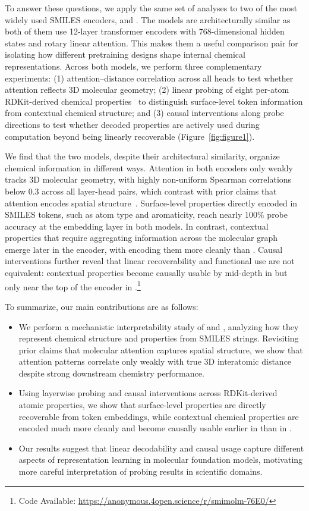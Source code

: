 To answer these questions, we apply the same set of analyses to two of the most widely used SMILES encoders, \molm and \smi. The models are architecturally similar as both of them use 12-layer transformer encoders with 768-dimensional hidden states and rotary linear attention. This makes them a useful comparison pair for isolating how different pretraining designs shape internal chemical representations. Across both models, we perform three complementary experiments: (1) attention–distance correlation across all heads to test whether attention reflects 3D molecular geometry; (2) linear probing of eight per-atom RDKit-derived chemical properties~\cite{rdkit} to distinguish surface-level token information from contextual chemical structure; and (3) causal interventions along probe directions to test whether decoded properties are actively used during computation beyond being linearly recoverable (Figure~\ref{fig:figure1}).

We find that the two models, despite their architectural similarity, organize chemical information in different ways. Attention in both encoders only weakly tracks 3D molecular geometry, with highly non-uniform Spearman correlations below $0.3$ across all layer-head pairs, which contrast with prior claims that \molm attention encodes spatial structure~\cite{ross2022largescalechemicallanguagerepresentations}. Surface-level properties directly encoded in SMILES tokens, such as atom type and aromaticity, reach nearly $100\%$ probe accuracy at the embedding layer in both models. In contrast, contextual properties that require aggregating information across the molecular graph emerge later in the encoder, with \smi encoding them more cleanly than \molm. Causal interventions further reveal that linear recoverability and functional use are not equivalent: contextual properties become causally usable by mid-depth in \smi but only near the top of the encoder in \molm.\footnote{Code Available: \url{https://anonymous.4open.science/r/smimolm-76E0/}}

\noindent To summarize, our main contributions are as follows:
\begin{itemize}[topsep=2pt,partopsep=0pt,itemsep=2pt,parsep=0pt,leftmargin=*]
    \item We perform a mechanistic interpretability study of \molm and \smi, analyzing how they represent chemical structure and properties from SMILES strings. Revisiting prior claims that molecular attention captures spatial structure, we show that attention patterns correlate only weakly with true 3D interatomic distance despite strong downstream chemistry performance.
    \item Using layerwise probing and causal interventions across RDKit-derived atomic properties, we show that surface-level properties are directly recoverable from token embeddings, while contextual chemical properties are encoded much more cleanly and become causally usable earlier in \smi than in \molm.
    \item Our results suggest that linear decodability and causal usage capture different aspects of representation learning in molecular foundation models, motivating more careful interpretation of probing results in scientific domains.
\end{itemize}
